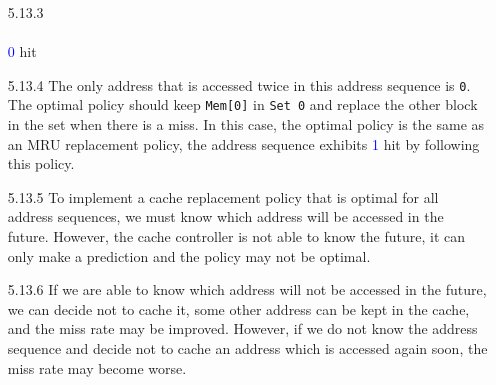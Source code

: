 \documentclass[12pt, a4paper]{article}
\begin{document}
\begin{itemize}[font=\bfseries]
\item[5.13.3]
 \\
\vspace*{0.2cm} \\
\textcolor{blue}{0} hit

\item[5.13.4]
The only address that is accessed twice in this address sequence is \texttt{0}. The optimal policy should keep \texttt{Mem[0]} in \texttt{Set 0} and replace the other block in the set when there is a miss. In this case, the optimal policy is the same as an MRU replacement policy, the address sequence exhibits \textcolor{blue}{1} hit by following this policy.

\item[5.13.5]
To implement a cache replacement policy that is optimal for all address sequences, we must know which address will be accessed in the future. However, the cache controller is not able to know the future, it can only make a prediction and the policy may not be optimal. 

\item[5.13.6]
If we are able to know which address will not be accessed in the future, we can decide not to cache it, some other address can be kept in the cache, and the miss rate may be improved. However, if we do not know the address sequence and decide not to cache an address which is accessed again soon, the miss rate may become worse.


\end{itemize}
\end{document}

